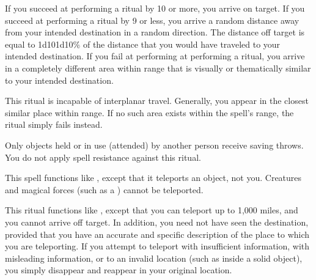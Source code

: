 \begin{spelleffect}
If you succeed at performing a  ritual by 10 or more, you arrive on target. If you succeed at performing a  ritual by 9 or less, you arrive a random distance away from your intended destination in a random direction. The distance off target is equal to 1d10\mult1d10\% of the distance that you would have traveled to your intended destination. If you fail at performing at performing a  ritual, you arrive in a completely different area within range that is visually or thematically similar to your intended destination.
\end{spelleffect}
\begin{spellnotes}
This ritual is incapable of interplanar travel. Generally, you appear in the closest similar place within range. If no such area exists within the spell's range, the ritual simply fails instead.

Only objects held or in use (attended) by another person receive saving throws. You do not apply spell resistance against this ritual. 
\end{spellnotes}

\begin{spelleffect}
This spell functions like , except that it teleports an object, not you. Creatures and magical forces (such as a ) cannot be teleported.
\end{spelleffect}

\begin{spelleffect}
This ritual functions like , except that you can teleport up to 1,000 miles, and you cannot arrive off target. In addition, you need not have seen the destination, provided that you have an accurate and specific description of the place to which you are teleporting. If you attempt to teleport with insufficient information, with misleading information, or to an invalid location (such as inside a solid object), you simply disappear and reappear in your original location.
\end{spelleffect}

